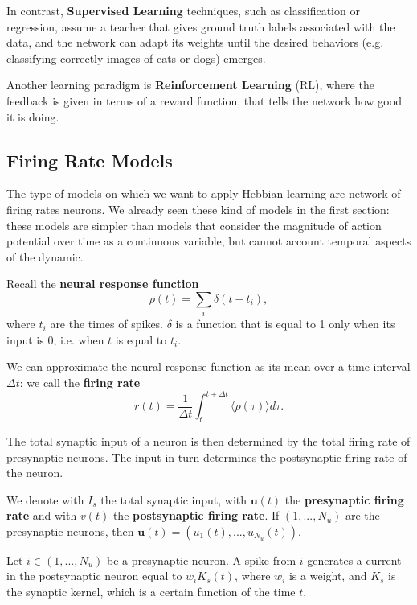 \documentclass[oneside]{book}
\renewcommand{\u}{\mathbf{u}}
\theoremstyle{definition}
\theoremstyle{plain}
\begin{document}
In contrast, \textbf{Supervised Learning} techniques, such as classification or regression, assume a teacher that gives ground truth labels associated with the data, and the network can adapt its weights until the desired behaviors (e.g. classifying correctly images of cats or dogs) emerges.

Another learning paradigm is \textbf{Reinforcement Learning} (RL), where the feedback is given in terms of a reward function, that tells the network how good it is doing. 

\subsection{Firing Rate Models}
The type of models on which we want to apply Hebbian learning are network of firing rates neurons. We already seen these kind of models in the first section: these models are simpler than models that consider the magnitude of action potential over time as a continuous variable, but cannot account temporal aspects of the dynamic.

Recall the \textbf{neural response function}
\begin{equation}
    \label{eqn:neural-response}
    \rho(t) = \sum_{i} \delta(t-t_i),
\end{equation}
where $t_i$ are the times of spikes. $\delta$ is a function that is equal to 1 only when its input is 0, i.e. when $t$ is equal to $t_i$.

We can approximate the neural response function as its mean over a time interval $\Delta t$: we call the \textbf{firing rate}
\begin{equation}
    r(t) = \frac{1}{\Delta t} \int_{t}^{t+\Delta t} \langle \rho(\tau)\rangle d\tau.
\end{equation}

The total synaptic input of a neuron is then determined by the total firing rate of presynaptic neurons.
The input in turn determines the postsynaptic firing rate of the neuron.

We denote with $I_s$ the total synaptic input, with $\u(t)$ the \textbf{presynaptic firing rate} and with $ v(t)$ the \textbf{postsynaptic firing rate}. 
If $(1,...,N_u)$ are the presynaptic neurons, then $\u(t)=(u_1(t),...,u_{N_u}(t))$. 

Let $i\in(1,...,N_u)$ be a presynaptic neuron.  A spike from $i$ generates a current in the postsynaptic neuron equal to $w_iK_s(t)$, where $w_i$ is a weight, and $K_s$ is the synaptic kernel, which is a certain function of the time $t$. 
\end{document}
